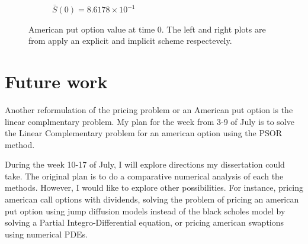 \documentclass[a4paper,12pt]{article}
\begin{document}
\begin{figure}[H]
\begin{subfigure}[b]{0.5\textwidth}
        \caption{$\bar{S}(0) = 8.6178 \times 10^{-1}$}
        \label{fig:three sin x}
    \end{subfigure} 
    \caption{American put option value at time 0. The left and right plots are 
    from apply an explicit and implicit scheme respectevely.}
    \label{fig:explicit_implicit_fd}
  \end{figure}

  \section{Future work}

  Another reformulation of the pricing problem or an American put option is the 
  linear complmentary problem. My plan for the week from 3-9 of July is to solve
  the Linear Complementary problem for an american option using the PSOR method. 
  
  During the week 10-17 of July, I will explore directions my dissertation could take. 
  The original plan is to do a comparative numerical analysis of each the methods. 
  However, I would like to explore other possibilities. For instance, 
  pricing american call options with dividends, solving the problem of pricing an 
  american put option using jump diffusion models instead of the black scholes 
  model by solving a Partial Integro-Differential equation, or pricing american swaptions
  using numerical PDEs.
  
  \medskip

  \printbibliography
  
\end{document}
